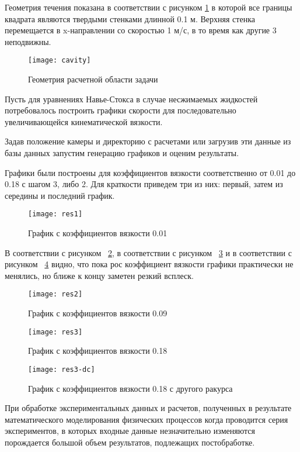 \documentclass[14pt]{extreport}
\begin{document}
Геометрия течения показана в соответствии с рисунком \ref{fig20} в которой все границы квадрата являются твердыми стенками длинной 0.1 м. Верхняя стенка перемещается в x-направлении со скоростью 1 м/с, в то время как другие 3 неподвижны.

\begin{figure}[H]
	\centerline{\texttt{[image: cavity]}}
	\caption{Геометрия расчетной области задачи}
	\label{fig20}
\end{figure}


Пусть для уравнениях Навье-Стокса в случае несжимаемых жидкостей потребовалось построить графики скорости для последовательно увеличивающейся кинематической вязкости. 

Задав положение камеры и директорию с расчетами или загрузив эти данные из базы данных запустим генерацию графиков и оценим результаты. 

Графики были построены для коэффициентов вязкости соответственно от 0.01 до 0.18 с шагом 3, либо 2. Для краткости приведем три из них: первый, затем из середины и последний график.


\begin{figure}[H]
	\centerline{\texttt{[image: res1]}}
	\caption{График с коэффициентов вязкости 0.01}
	\label{fig16}
\end{figure}

В соответствии с рисунком ~\ref{fig16}, в соответствии с рисунком ~\ref{fig17} и в соответствии с рисунком ~\ref{fig18} видно, что пока рос коэффициент вязкости графики практически не менялись, но ближе к концу заметен резкий всплеск.

\begin{figure}[H]
	\centerline{\texttt{[image: res2]}}
	\caption{График с коэффициентов вязкости 0.09}
	\label{fig17}
\end{figure}

\begin{figure}[H]
	\centerline{\texttt{[image: res3]}}
	\caption{График с коэффициентов вязкости 0.18}
	\label{fig18}
\end{figure}

\begin{figure}[H]
	\centerline{\texttt{[image: res3-dc]}}
	\caption{График с коэффициентов вязкости 0.18 с другого ракурса}
	\label{fig19}
\end{figure}

\conclusions
При обработке экспериментальных данных и расчетов, полученных в результате математического моделирования физических процессов когда проводится серия экспериментов, в которых входные данные незначительно изменяются порождается большой объем результатов, подлежащих постобработке.
\end{document}
